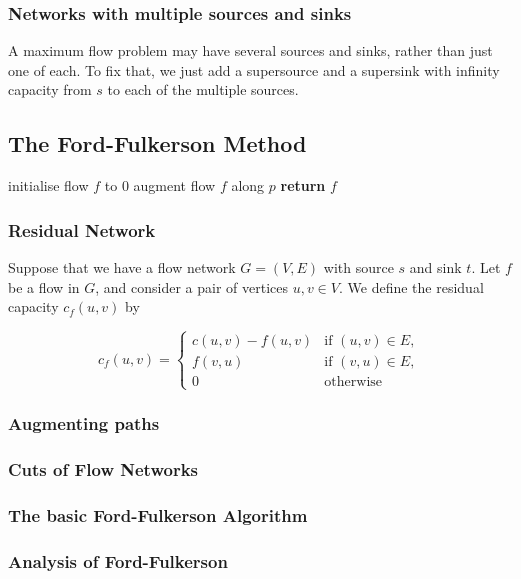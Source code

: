 \documentclass[12pt,a4paper]{article}
\begin{document}
\subsubsection{Networks with multiple sources and sinks}
A maximum flow problem may have several sources and sinks, rather than just one of each. To fix that, we just add a supersource and a supersink with infinity capacity from $s$ to each of the multiple sources.
\subsection{The Ford-Fulkerson Method}

\begin{algorithm}
\begin{algorithmic}[1]
   \State initialise flow $f$ to $0$
      \State augment flow $f$ along $p$
   \EndWhile
   \State \textbf{return} $f$
\end{algorithmic}
\end{algorithm}
\subsubsection{Residual Network}
Suppose that we have a flow network $G = (V, E)$ with source $s$ and sink $t$. Let $f$ be a flow in $G$, and consider a pair of vertices $u, v \in V$. We define the residual capacity $c_f(u, v)$ by

\[
 c_f(u,v) =
  \begin{cases}
  	c(u,v) - f(u,v) & \text{if } (u,v) \in E, \\
  	f(v,u) & \text{if } (v,u) \in E, \\
  	0 & \text{otherwise}
  \end{cases}
\]

\subsubsection{Augmenting paths}
\subsubsection{Cuts of Flow Networks}
\subsubsection{The basic Ford-Fulkerson Algorithm}
\subsubsection{Analysis of Ford-Fulkerson}
\end{document}
